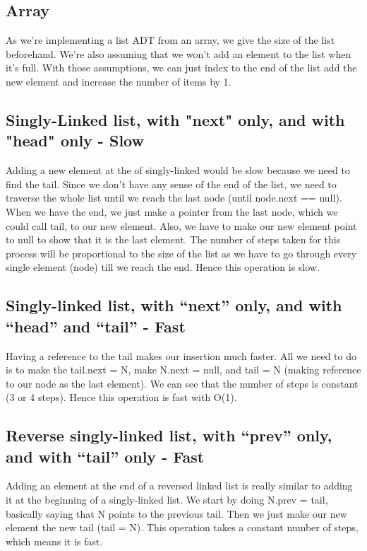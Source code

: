 \documentclass{article}
\begin{document}
\subsection{Array}
As we're implementing a list ADT from an array, we give the size of the list beforehand. We're also assuming that we won't add an element to the list when it's full. With those assumptions, we can just index to the end of the list add the new element and increase the number of items by 1.

\subsection{Singly-Linked list, with "next" only, and with "head" only - Slow}
Adding a new element at the of singly-linked would be slow because we need to find the tail. Since we don't have any sense of the end of the list, we need to traverse the whole list until we reach the last node (until node.next == null). When we have the end, we just make a pointer from the last node, which we could call tail, to our new element. Also, we have to make our new element point to null to show that it is the last element. The number of steps taken for this process will be proportional to the size of the list as we have to go through every single element (node) till we reach the end. Hence this operation is slow.

\subsection{Singly-linked list, with “next” only, and with “head” and “tail” - Fast}
Having a reference to the tail makes our insertion much faster. All we need to do is to make the tail.next = N, make N.next = null, and tail = N (making reference to our node as the last element). We can see that the number of steps is constant (3 or 4 steps). Hence this operation is fast with O(1).

\subsection{Reverse singly-linked list, with “prev” only, and with “tail” only - Fast}
Adding an element at the end of a reversed linked list is really similar to adding it at the beginning of a singly-linked list. We start by doing N.prev = tail, basically saying that N points to the previous tail. Then we just make our new element the new tail (tail = N). This operation takes a constant number of steps, which means it is fast.
\end{document}
